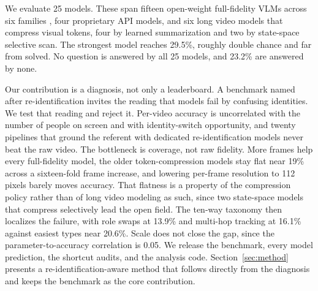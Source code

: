 \documentclass{article}
\newcommand{\nummodels}{25}
\begin{document}
We evaluate \nummodels{} models. These span fifteen open-weight full-fidelity VLMs across six families \citep{internvl3,qwen25vl,gemma3,ovis,videollava,videochatflash}, four proprietary API models, and six long video models that compress visual tokens, four by learned summarization \citep{longvu,malmm,videoxl,videoxlpro} and two by state-space selective scan. The strongest model reaches 29.5\%, roughly double chance and far from solved. No question is answered by all \nummodels{} models, and 23.2\% are answered by none.

Our contribution is a diagnosis, not only a leaderboard. A benchmark named after re-identification invites the reading that models fail by confusing identities. We test that reading and reject it. Per-video accuracy is uncorrelated with the number of people on screen and with identity-switch opportunity, and twenty pipelines that ground the referent with dedicated re-identification models never beat the raw video. The bottleneck is coverage, not raw fidelity. More frames help every full-fidelity model, the older token-compression models stay flat near 19\% across a sixteen-fold frame increase, and lowering per-frame resolution to 112 pixels barely moves accuracy. That flatness is a property of the compression policy rather than of long video modeling as such, since two state-space models that compress selectively lead the open field. The ten-way taxonomy then localizes the failure, with role swaps at 13.9\% and multi-hop tracking at 16.1\% against easiest types near 20.6\%. Scale does not close the gap, since the parameter-to-accuracy correlation is 0.05. We release the benchmark, every model prediction, the shortcut audits, and the analysis code. Section~\ref{sec:method} presents a re-identification-aware method that follows directly from the diagnosis and keeps the benchmark as the core contribution.
\end{document}
